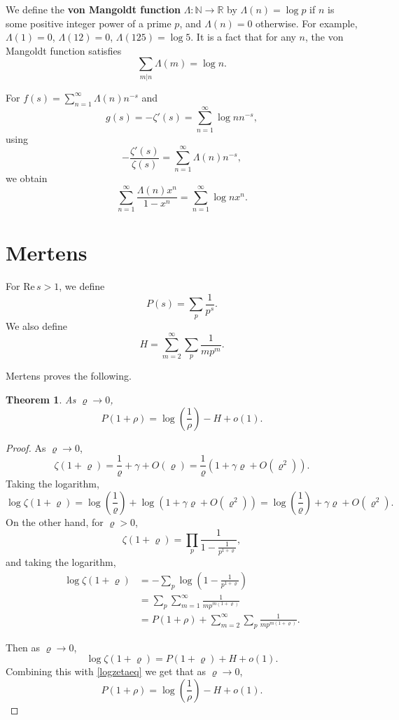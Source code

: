 \documentclass{article}
\def\Re{\ensuremath{\mathrm{Re}}\,}
\newtheorem{theorem}{Theorem}
\begin{document}
We define the \textbf{von Mangoldt function} $\Lambda:\mathbb{N} \to \mathbb{R}$ by
$\Lambda(n)=\log p$ if $n$ is some positive integer power of a prime $p$, and $\Lambda(n)=0$ otherwise. For example,
$\Lambda(1)=0$, $\Lambda(12)=0$, $\Lambda(125)=\log 5$. It is a fact \cite[p.~254, Theorem 296]{wright} that for any $n$, the von Mangoldt function satisfies
\begin{equation}
\sum_{m | n} \Lambda(m) = \log n.
\label{mangoldtsum}
\end{equation}

For $f(s)=\sum_{n=1}^\infty \Lambda(n) n^{-s}$ and
\[
g(s) = -\zeta'(s) = \sum_{n=1}^\infty \log n n^{-s},
\]
using \cite[p.~253, Theorem 294]{wright}
\[
-\frac{\zeta'(s)}{\zeta(s)} = \sum_{n=1}^\infty \Lambda(n) n^{-s},
\]
we obtain
\[
\sum_{n=1}^\infty \frac{\Lambda(n) x^n}{1-x^n} = \sum_{n=1}^\infty \log n x^n.
\]



\section{Mertens}
For $\Re s>1$, we define
\[
P(s) = \sum_p \frac{1}{p^s}.
\]
We also 
define
\[
H = \sum_{m=2}^\infty \sum_p \frac{1}{mp^m}.
\]

Mertens \cite{mertens} proves the following.

\begin{theorem}
As $\varrho \to 0$,
\[
P(1+\rho) = \log \left( \frac{1}{\rho} \right)-H+o(1).
\]
\end{theorem}
\begin{proof}
As $\varrho \to 0$,
\[
\zeta(1+\varrho) = \frac{1}{\varrho}+\gamma+O(\varrho) = \frac{1}{\varrho}(1+\gamma \varrho + O(\varrho^2)).
\]
Taking the logarithm,
\begin{equation}
\log \zeta(1+\varrho) = \log \left(\frac{1}{\varrho} \right) + \log(1+\gamma \varrho + O(\varrho^2))
= \log \left(\frac{1}{\varrho} \right)  + \gamma \varrho+O(\varrho^2).
\label{logzetaeq}
\end{equation}
On the other hand, for $\varrho>0$,
\[
\zeta(1+\varrho) = \prod_p \frac{1}{1-\frac{1}{p^{1+\varrho}}},
\]
and taking the logarithm,
\begin{align*}
\log \zeta(1+\varrho) &= -  \sum_p \log\left(1-\frac{1}{p^{1+\varrho}}\right)\\
&=\sum_p \sum_{m=1}^\infty \frac{1}{mp^{m(1+\varrho)}}\\
&=P(1+\rho) + \sum_{m=2}^\infty \sum_p  \frac{1}{mp^{m(1+\varrho)}}.
\end{align*}

Then as $\varrho \to 0$,
\[
\log \zeta(1+\varrho)  = P(1+\varrho) + H + o(1).
\]
Combining this with \eqref{logzetaeq} we get that as $\varrho \to 0$,
\[
P(1+\rho) = \log \left( \frac{1}{\rho} \right)-H+o(1).
\]
\end{proof}
\end{document}
